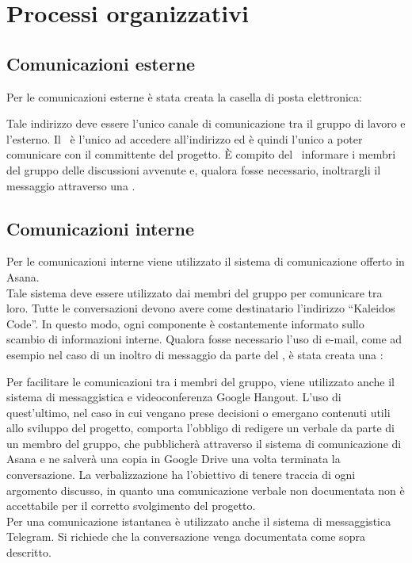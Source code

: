 \documentclass[../NormeDiProgetto.tex]{subfiles}
\begin{document}
	\section{Processi organizzativi}
		\subsection{Comunicazioni esterne}
			Per le comunicazioni esterne è stata creata la casella di posta
			elettronica:
			\begin{center}
				\mailkaleidoscode
			\end{center}
			Tale indirizzo deve essere l'unico canale di comunicazione tra il
			gruppo di lavoro e l'esterno.
			Il \responsabilediprogetto\ è l'unico ad accedere
			all'indirizzo ed è quindi l'unico a poter comunicare con il
			committente del progetto. È compito del \responsabilediprogetto\ informare
			i membri del gruppo delle discussioni avvenute e,
			qualora fosse necessario, inoltrargli il messaggio attraverso
			una .
		\subsection{Comunicazioni interne}
			Per le comunicazioni interne viene utilizzato il sistema di
			comunicazione offerto in Asana.\\
			Tale sistema deve essere utilizzato dai membri del gruppo
			per comunicare tra loro. Tutte le conversazioni devono avere
			come destinatario l'indirizzo ``Kaleidos Code''.
			In questo modo, ogni componente è costantemente informato sullo
			scambio di informazioni interne.
			Qualora fosse necessario l'uso di e-mail, come ad esempio nel caso di
			un inoltro di messaggio da parte del \responsabilediprogetto, è stata creata una :
			\begin{center}
				\mailinglist
			\end{center}
			Per facilitare le comunicazioni tra i membri del gruppo, viene
			utilizzato anche il sistema di messaggistica e videoconferenza
			Google Hangout.
			L'uso di quest'ultimo, nel caso in cui
			vengano prese decisioni	o emergano contenuti utili allo
			sviluppo del progetto, comporta l'obbligo di redigere un verbale
			da parte di un membro del gruppo, che pubblicherà attraverso il sistema
			di comunicazione di Asana e ne salverà una copia in Google Drive una volta
			terminata la conversazione. La verbalizzazione ha l'obiettivo di tenere
			traccia di ogni argomento discusso, in
			quanto una comunicazione verbale non documentata non è
			accettabile per il corretto svolgimento del progetto.\\
			Per una comunicazione istantanea è utilizzato anche il sistema
			di messaggistica Telegram. Si richiede che la conversazione
			venga documentata come sopra descritto.
\end{document}
